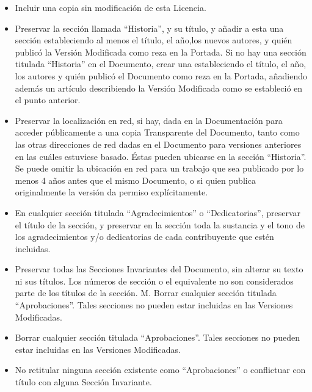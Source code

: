 \begin{itemize}
\item Incluir una copia sin modificación de esta Licencia.

\item Preservar la sección llamada ``Historia'', y su título, y añadir
a esta una sección estableciendo al menos el título, el año,los nuevos
autores,  y  quién publicó  la  Versión  Modificada  como reza  en  la
Portada. Si no hay una  sección titulada ``Historia'' en el Documento,
crear una estableciendo el título, el año, los autores y quién publicó
el Documento  como reza  en la Portada,  añadiendo además  un artículo
describiendo  la Versión  Modificada como  se estableció  en el  punto
anterior.

\item  Preservar  la   localización  en  red,  si  hay,   dada  en  la
Documentación para  acceder públicamente a una  copia Transparente del
Documento,  tanto  como las  otras  direcciones  de  red dadas  en  el
Documento para  versiones anteriores  en las cuáles  estuviese basado.
Éstas pueden ubicarse  en la sección ``Historia''. Se  puede omitir la
ubicación en red para un trabajo que sea publicado por lo menos 4 años
antes  que el  mismo Documento,  o si  quien publica  originalmente la
versión da permiso explícitamente.

\item   En   cualquier    sección   titulada   ``Agradecimientos''   o
``Dedicatorias'', preservar el título de la sección, y preservar en la
sección  toda  la sustancia  y  el  tono  de los  agradecimientos  y/o
dedicatorias de cada contribuyente que estén incluidas.

\item  Preservar todas  las Secciones  Invariantes del  Documento, sin
alterar  su  texto  ni  sus  títulos. Los  números  de  sección  o  el
equivalente no son considerados parte de los títulos de la sección. M.
Borrar cualquier sección titulada ``Aprobaciones''. Tales secciones no
pueden estar incluidas en las Versiones Modificadas.

\item  Borrar  cualquier   sección  titulada  ``Aprobaciones''.  Tales
secciones no pueden estar incluidas en las Versiones Modificadas.

\item No  retitular ninguna sección existente  como ``Aprobaciones'' o
conflictuar con título con alguna Sección Invariante.

\end{itemize}

